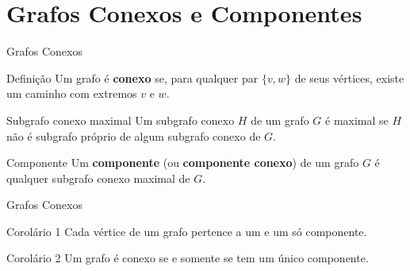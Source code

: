 \documentclass[xcolor=dvipsnames,table]{beamer}
\begin{document}
	\section{Grafos Conexos e Componentes}
	\begin{frame}{Grafos Conexos}
		\begin{block}{Definição}
			Um grafo é {\bf conexo} se, para qualquer par $\{v,w\}$ de seus vértices, existe um caminho com extremos $v$ e $w$.
		\end{block} \pause
		\begin{block}{Subgrafo conexo maximal}
			Um subgrafo conexo $H$ de um grafo $G$ é maximal se $H$ não é subgrafo próprio de algum subgrafo conexo de $G$.
		\end{block} \pause
		\begin{block}{Componente}
			Um {\bf componente} (ou {\bf componente conexo}) de um grafo $G$ é qualquer subgrafo conexo maximal de $G$.
		\end{block}
	\end{frame}
	
	\begin{frame}{Grafos Conexos}
		\begin{block}{Corolário 1}
			Cada vértice de um grafo pertence a um e um só componente.
		\end{block} \pause
		\begin{block}{Corolário 2}
			Um grafo é conexo se e somente se tem um único componente.
		\end{block}
	\end{frame}
	
	\begin{frame}
		\titlepage
	\end{frame}
	
\end{document}
